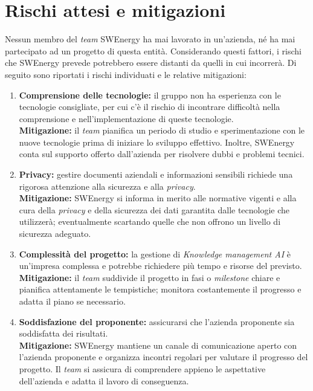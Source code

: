 \section{Rischi attesi e mitigazioni}

Nessun membro del \textit{team} SWEnergy ha mai lavorato in un'azienda, né ha
mai partecipato ad un progetto di questa entità. Considerando questi fattori, i
rischi che SWEnergy prevede potrebbero essere distanti da quelli in cui
incorrerà. 
Di seguito sono riportati i rischi individuati e le relative mitigazioni:
\begin{enumerate}

\item \textbf{Comprensione delle tecnologie:} il gruppo non ha esperienza 
con le tecnologie consigliate, per cui c'è il rischio di incontrare 
difficoltà nella comprensione e nell'implementazione di queste tecnologie. \\
\textbf{Mitigazione:} il \textit{team} pianifica un periodo di studio e 
sperimentazione con 
le nuove tecnologie prima di iniziare lo sviluppo effettivo. Inoltre, SWEnergy
conta sul supporto offerto dall'azienda per risolvere dubbi e problemi tecnici.

\item \textbf{Privacy:} gestire documenti aziendali e 
informazioni sensibili richiede una rigorosa attenzione alla sicurezza e alla 
\textit{privacy}. \\
\textbf{Mitigazione:} SWEnergy si informa in merito alle normative vigenti
e alla
cura della \textit{privacy} e della sicurezza dei dati garantita dalle tecnologie che
utilizzerà; eventualmente scartando quelle che non offrono un livello di
sicurezza adeguato.

\item \textbf{Complessità del progetto:} la gestione di \textit{Knowledge 
management AI} è
un'impresa complessa e potrebbe richiedere più tempo e risorse del previsto. \\
\textbf{Mitigazione:} il \textit{team} suddivide il progetto in fasi o 
\textit{milestone} chiare e 
pianifica attentamente le tempistiche; monitora costantemente il progresso e
adatta il piano se necessario. 

\item \textbf{Soddisfazione del proponente:} assicurarsi che l'azienda proponente sia 
soddisfatta dei risultati. \\
\textbf{Mitigazione:} SWEnergy mantiene un canale di comunicazione aperto con 
l'azienda 
proponente e organizza incontri regolari per valutare il progresso del progetto. 
Il \textit{team} si assicura di comprendere appieno le aspettative dell'azienda 
e adatta il lavoro di conseguenza.
\end{enumerate}
